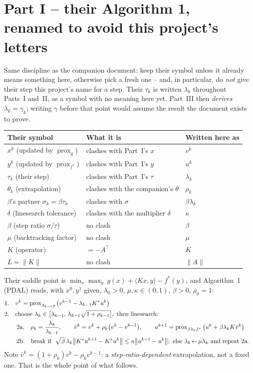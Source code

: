 \documentclass[11pt]{article}
\newcommand{\prox}{\operatorname{prox}}
\begin{document}
\section*{Part I -- their Algorithm 1, renamed to avoid this project's letters}
Same discipline as the companion document: keep their symbol unless it already
means something here, otherwise pick a fresh one -- and, in particular, do
\emph{not} give their step this project's name for a step. Their $\tau_k$ is
written $\lambda_k$ throughout Parts~I and~II, as a symbol with no meaning here
yet. Part~III then \emph{derives} $\lambda_k=\gamma_k$; writing $\gamma$ before
that point would assume the result the document exists to prove.
\begin{center}
\begin{tabular}{@{}lll@{}}
\toprule
Their symbol & What it is & Written here as\\
\midrule
$x^k$ (updated by $\prox_g$) & clashes with Part~I's $x$ & $v^k$\\
$y^k$ (updated by $\prox_{f^*}$) & clashes with Part~I's $y$ & $u^k$\\
$\tau_k$ (their step) & clashes with Part~I's $\tau$ & $\lambda_k$\\
$\theta_k$ (extrapolation) & clashes with the companion's $\theta$ & $\rho_k$\\
$\beta$'s partner $\sigma_k=\beta\tau_k$ & clashes with $\sigma$ & $\beta\lambda_k$\\
$\delta$ (linesearch tolerance) & clashes with the multiplier $\delta$ & $\kappa$\\
$\beta$ (step ratio $\sigma/\tau$) & no clash & $\beta$\\
$\mu$ (backtracking factor) & no clash & $\mu$\\
$K$ (operator) & $=-A^\top$ & $K$\\
$L=\|K\|$ & no clash & $\|A\|$\\
\bottomrule
\end{tabular}
\end{center}
Their saddle point is $\min_x\max_y\ g(x)+\langle Kx,y\rangle-f^*(y)$, and
Algorithm~1 (PDAL) reads, with $x^0,y^1$ given, $\lambda_0>0$,
$\mu,\kappa\in(0,1)$, $\beta>0$, $\rho_0=1$:
\begin{align}
&\text{1.}\quad v^k=\prox_{\lambda_{k-1}g}\big(v^{k-1}-\lambda_{k-1}K^*u^k\big) \label{eq:m1}\\
&\text{2.}\quad\text{choose }\lambda_k\in\big[\lambda_{k-1},\,\lambda_{k-1}\sqrt{1+\rho_{k-1}}\big],\text{ then linesearch:}\notag\\
&\qquad\text{2a.}\quad \rho_k=\frac{\lambda_k}{\lambda_{k-1}},\qquad
\bar v^k=v^k+\rho_k\big(v^k-v^{k-1}\big),\qquad
u^{k+1}=\prox_{\beta\lambda_kf^*}\big(u^k+\beta\lambda_kK\bar v^k\big) \label{eq:m2a}\\
&\qquad\text{2b.}\quad\text{break if }\ \sqrt{\beta}\,\lambda_k\big\|K^*u^{k+1}-K^*u^k\big\|\le\kappa\big\|u^{k+1}-u^k\big\|;
\ \text{else }\lambda_k\!\leftarrow\!\mu\lambda_k\text{ and repeat 2a.} \label{eq:m2b}
\end{align}
Note $\bar v^k=(1+\rho_k)v^k-\rho_kv^{k-1}$: a \emph{step-ratio-dependent}
extrapolation, not a fixed one. That is the whole point of what follows.
\end{document}
